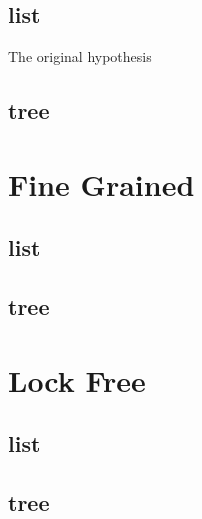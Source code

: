 \documentclass[10pt,a4paper]{article}
\begin{document}
\subsection{list}
The original hypothesis
\subsection{tree}

\section{Fine Grained}
\subsection{list}
\subsection{tree}

\section{Lock Free}
\subsection{list}
\subsection{tree}
\end{document}
